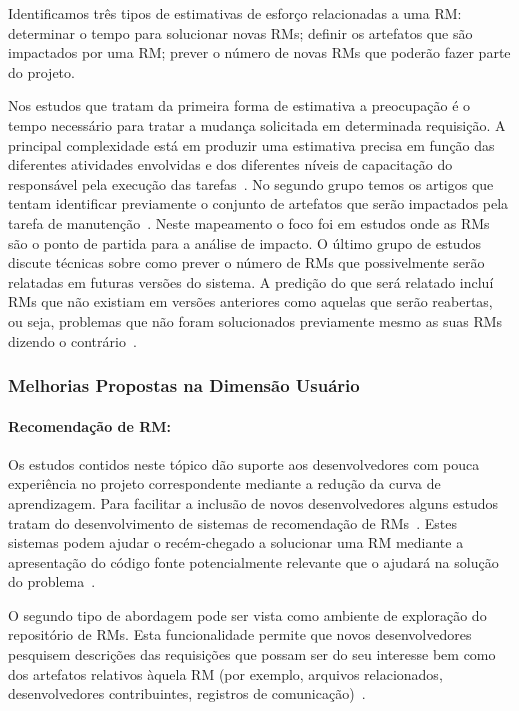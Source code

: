 Identificamos três tipos de estimativas de esforço relacionadas a uma RM\@:
determinar o tempo para solucionar novas RMs; definir os artefatos que são
impactados por uma RM\@; prever o número de novas RMs que poderão fazer parte do
projeto.

Nos estudos que tratam da primeira forma de estimativa a preocupação é o tempo
necessário para tratar a mudança solicitada em determinada requisição. A
principal complexidade está em produzir uma estimativa precisa em função das
di\-fe\-ren\-tes atividades envolvidas e dos diferentes níveis de capacitação do
responsável pela execução das tarefas~\cite{xia2015automatic}. No segundo grupo
temos os artigos que tentam identificar previamente o conjunto de artefatos que
serão impactados pela tarefa de manutenção~\cite{Nagwani2010}. Neste mapeamento
o foco foi em estudos onde as RMs são o ponto de partida para a análise de
impacto. O último grupo de estudos discute técnicas sobre como prever o número
de RMs que possivelmente serão relatadas em futuras versões do sistema. A
predição do que será relatado incluí RMs que não existiam em versões anteriores
como aquelas que serão reabertas, ou seja, problemas que não foram solucionados
previamente mesmo as suas RMs dizendo o contrário~\cite{xia2015automatic}.

\subsubsection{Melhorias Propostas na Dimensão Usuário}
\label{ssub:melhorias_dim_usuario}

\paragraph{Recomendação de RM:}

Os estudos contidos neste tópico dão suporte aos desenvolvedores com pouca
experiência no projeto correspondente mediante a redução da curva de
aprendizagem. Para facilitar a inclusão de novos desenvolvedores alguns estudos
tratam do desenvolvimento de sistemas de recomendação de
RMs~\cite{malheiros2012source, Wang2011bug}. Estes sistemas podem ajudar o
recém-chegado a solucionar uma RM mediante a apresentação do código fonte
potencialmente relevante que o ajudará na solução do
problema~\cite{malheiros2012source}.

O segundo tipo de abordagem pode ser vista como ambiente de exploração do
repositório de RMs. Esta funcionalidade permite que novos desenvolvedores
pesquisem descrições das requisições que possam ser do seu interesse bem como
dos artefatos relativos àquela RM (por exemplo, arquivos relacionados,
desenvolvedores contribuintes, registros de comunicação)~\cite{Wang2011bug}.

